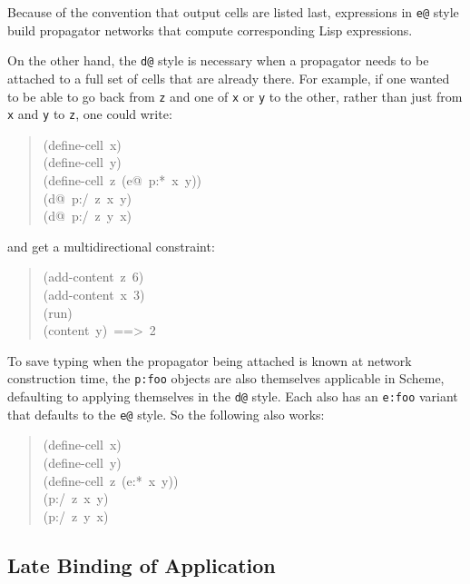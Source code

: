 \documentclass[12pt,letterpaper,english]{article}
\begin{document}
Because of the convention that output cells are listed last,
expressions in \texttt{e@} style build propagator networks that
compute corresponding Lisp expressions.

On the other hand, the \texttt{d@} style is necessary when a propagator
needs to be attached to a full set of cells that are already there.
For example, if one wanted to be able to go back from \texttt{z} and one of
\texttt{x} or \texttt{y} to the other, rather than just from \texttt{x} and \texttt{y} to
\texttt{z}, one could write:
\begin{quote}{\ttfamily \raggedright \noindent
(define-cell~x)~\\
(define-cell~y)~\\
(define-cell~z~(e@~p:*~x~y))~\\
(d@~p:/~z~x~y)~\\
(d@~p:/~z~y~x)
}\end{quote}
and get a multidirectional constraint:
\begin{quote}{\ttfamily \raggedright \noindent
(add-content~z~6)~\\
(add-content~x~3)~\\
(run)~\\
(content~y)~==>~2
}\end{quote}

To save typing when the propagator being attached is known at network
construction time, the \texttt{p:foo} objects are also themselves
applicable in Scheme, defaulting to applying themselves in the \texttt{d@}
style.  Each also has an \texttt{e:foo} variant that defaults to the \texttt{e@}
style.  So the following also works:
\begin{quote}{\ttfamily \raggedright \noindent
(define-cell~x)~\\
(define-cell~y)~\\
(define-cell~z~(e:*~x~y))~\\
(p:/~z~x~y)~\\
(p:/~z~y~x)
}\end{quote}



\hypertarget{late-binding-of-application}{}
\subsection{Late Binding of Application}
\label{late-binding-of-application}
\end{document}
